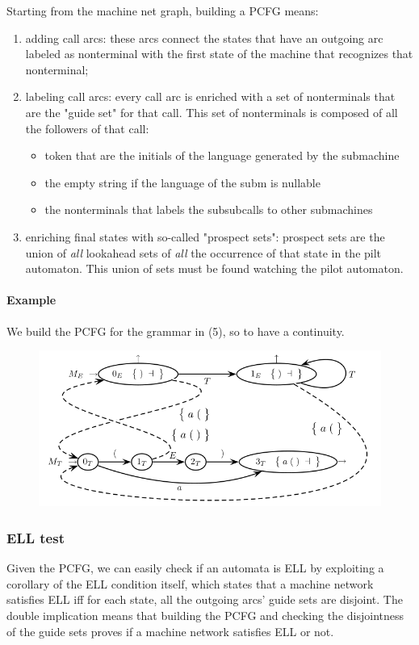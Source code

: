 				Starting from the machine net graph, building a PCFG means:
				\begin{enumerate}
					\item adding call arcs: these arcs connect the states that have an outgoing arc labeled as nonterminal with the first state of the machine that 
					recognizes that nonterminal;
					\item labeling call arcs: every call arc is enriched with a set of nonterminals that are the "guide set" for that call. This set of nonterminals 
					is composed of all the followers of that call:
						\begin{itemize}
							\item token that are the initials of the language generated by the submachine
							\item the empty string if the language of the subm is nullable
							\item the nonterminals that labels the subsubcalls to other submachines
						\end{itemize}
					\item enriching final states with so-called "prospect sets": prospect sets are the union of \emph{all} lookahead sets of \emph{all} the 
					occurrence of that state in the pilt automaton. This union of sets must be found watching the pilot automaton. 
				\end{enumerate}
				
				\paragraph{Example}
					We build the PCFG for the grammar in (5), so to have a continuity.
					\begin{figure}[H]
						\centering
						\includegraphics[width = \textwidth]{./images/PCFG.png}
					\end{figure}
			 
			\subsubsection{ELL test}
				Given the PCFG, we can easily check if an automata is ELL by exploiting a corollary of the ELL condition itself, which states that a machine network 
				satisfies ELL iff for each state, all the outgoing arcs' guide sets are disjoint. The double implication means that building the PCFG and checking 
				the disjointness of the guide sets proves if a machine network satisfies ELL or not.

